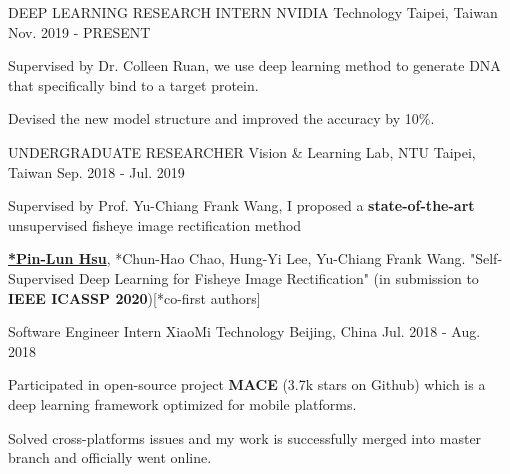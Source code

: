 

\begin{cventries}

\cventry
    {DEEP LEARNING RESEARCH INTERN} %
    {NVIDIA Technology} %
    {Taipei, Taiwan} %
    {Nov. 2019 - PRESENT} %
    {
      \begin{cvitems} %
        \item {Supervised by Dr. Colleen Ruan, we use deep learning method to generate DNA that specifically bind to a target protein. }
        \item {Devised the new model structure and improved the accuracy by 10\%.}
      \end{cvitems}
    }

\cventry
    {UNDERGRADUATE RESEARCHER} %
    {Vision \& Learning Lab, NTU} %
    {Taipei, Taiwan} %
    {Sep. 2018 - Jul. 2019} %
    {
      \begin{cvitems} %
        \item {Supervised by Prof. Yu-Chiang Frank Wang, I proposed a \textbf{state-of-the-art} unsupervised fisheye image rectification method}
        \item {\textbf{\underline{*Pin-Lun Hsu}}, *Chun-Hao Chao, Hung-Yi Lee, Yu-Chiang Frank Wang. "Self-Supervised Deep Learning for Fisheye Image Rectification" (in submission to \textbf{IEEE ICASSP 2020})[*co-first authors]}
      \end{cvitems}
    }



  \cventry
    {Software Engineer Intern} %
    {XiaoMi Technology} %
    {Beijing, China} %
    {Jul. 2018 - Aug. 2018} %
    {
      \begin{cvitems} %
        \item {Participated in open-source project \textbf{MACE} (3.7k stars on Github) which is a deep learning framework optimized for mobile platforms.}
        \item {Solved cross-platforms issues and my work is successfully merged into master branch and officially went online. }
      \end{cvitems}
    }

\end{cventries}

